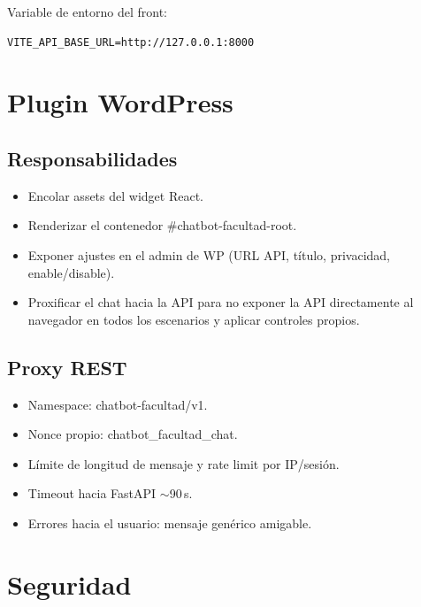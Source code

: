 \documentclass[11pt, a4paper, oneside]{report}
\begin{document}
Variable de entorno del front:
\begin{lstlisting}
VITE_API_BASE_URL=http://127.0.0.1:8000
\end{lstlisting}

\chapter{Plugin WordPress}

\section{Responsabilidades}
\begin{itemize}
  \item Encolar assets del widget React.
  \item Renderizar el contenedor {\#chatbot-facultad-root}.
  \item Exponer ajustes en el admin de WP (URL API, título, privacidad, enable/disable).
  \item Proxificar el chat hacia la API para no exponer la API directamente al navegador
        en todos los escenarios y aplicar controles propios.
\end{itemize}

\section{Proxy REST}
\begin{itemize}
  \item Namespace: {chatbot-facultad/v1}.
  \item Nonce propio: chatbot\_facultad\_chat.
  \item Límite de longitud de mensaje y rate limit por IP/sesión.
  \item Timeout hacia FastAPI $\sim$90\,s.
  \item Errores hacia el usuario: mensaje genérico amigable.
\end{itemize}

\chapter{Seguridad}
\end{document}
